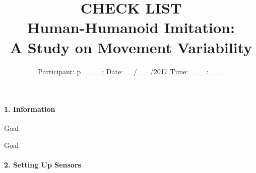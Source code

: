 \documentclass[a4paper]{article}
\begin{document}
\title{\vspace{-35mm} CHECK LIST \\ Human-Humanoid Imitation: \\ A Study on Movement Variability }
\author{Participant: p\_\_\_\_; Date:\_\_/\_\_ /2017 Time: \_\_\_:\_\_\_ }
\date{}
\maketitle

\thispagestyle{empty} %





\paragraph{1. Information}

\begin{CheckList}{Goal}
\begin{minipage}[t]{0.5\textwidth}
\end{minipage}
\hspace{0.5cm}
\begin{minipage}[t]{0.5\textwidth}
\end{minipage}
\end{CheckList}


\vspace{-2mm}

\begin{CheckList}{Goal}
\begin{minipage}[t]{0.5\textwidth}
\end{minipage}
\hspace{0.5cm}
\begin{minipage}[t]{0.5\textwidth}
\end{minipage}
\end{CheckList}



\paragraph{2. Setting Up Sensors}


\hspace{2cm}
\end{document}
